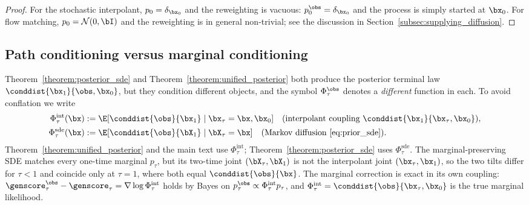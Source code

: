 \begin{proof}
For the stochastic interpolant, $p_0 = \delta_{\bx_0}$ and the reweighting is vacuous: $p_0^{\obs} = \delta_{\bx_0}$ and the process is simply started at $\bx_0$. For flow matching, $p_0 = \mathcal{N}(0,\bI)$ and the reweighting is in general non-trivial; see the discussion in Section~\ref{subsec:supplying_diffusion}.
\end{proof}


\subsection{Path conditioning versus marginal conditioning}
\label{subsec:doob_vs_marginal}
Theorem~\ref{theorem:posterior_sde} and Theorem~\ref{theorem:unified_posterior} both produce the posterior terminal law $\conddist{\bx_1}{\obs,\bx_0}$, but they condition different objects, and the symbol $\Phi_\tau^{\obs}$ denotes a \emph{different} function in each. To avoid conflation we write
\begin{align}
    \Phi_\tau^{\mathrm{int}}(\bx) &:= \E[\conddist{\obs}{\bx_1}\mid\bx_\tau=\bx,\bx_0] \quad\text{(interpolant coupling $\conddist{\bx_1}{\bx_\tau,\bx_0}$)}, \\
    \Phi_\tau^{\mathrm{sde}}(\bx) &:= \E[\conddist{\obs}{\bX_1}\mid\bX_\tau=\bx] \quad\text{(Markov diffusion \eqref{eq:prior_sde})}.
\end{align}
Theorem~\ref{theorem:unified_posterior} and the main text use $\Phi_\tau^{\mathrm{int}}$; Theorem~\ref{theorem:posterior_sde} uses $\Phi_\tau^{\mathrm{sde}}$. The marginal-preserving SDE matches every one-time marginal $p_\tau$, but its two-time joint $(\bX_\tau,\bX_1)$ is not the interpolant joint $(\bx_\tau,\bx_1)$, so the two tilts differ for $\tau<1$ and coincide only at $\tau=1$, where both equal $\conddist{\obs}{\bx}$. The marginal correction is exact in its own coupling: $\genscore_\tau^{\obs}-\genscore_\tau=\nabla\log\Phi_\tau^{\mathrm{int}}$ holds by Bayes on $p_\tau^{\obs}\propto\Phi_\tau^{\mathrm{int}}p_\tau$, and $\Phi_\tau^{\mathrm{int}}=\conddist{\obs}{\bx_\tau,\bx_0}$ is the true marginal likelihood.

